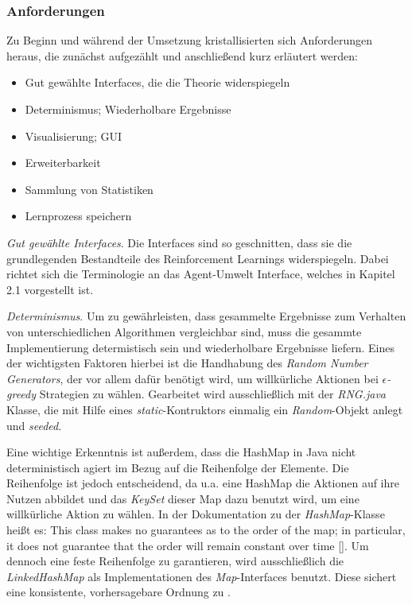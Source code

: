 

\subsubsection{Anforderungen}
Zu Beginn und während der Umsetzung kristallisierten sich Anforderungen heraus, die zunächst aufgezählt und anschließend kurz erläutert werden:

\begin{itemize}
    \item Gut gewählte Interfaces, die die Theorie widerspiegeln
    \item Determinismus; Wiederholbare Ergebnisse
    \item Visualisierung; GUI
    \item Erweiterbarkeit
    \item Sammlung von Statistiken
    \item Lernprozess speichern
\end{itemize}

\textit{Gut gewählte Interfaces}. Die Interfaces sind so geschnitten, dass sie die grundlegenden Bestandteile des Reinforcement Learnings widerspiegeln. Dabei richtet sich die Terminologie an das Agent-Umwelt Interface, welches in Kapitel 2.1 vorgestellt ist. 
\par 
\textit{Determinismus}. Um zu gewährleisten, dass gesammelte Ergebnisse zum Verhalten von unterschiedlichen Algorithmen vergleichbar sind, muss die gesammte Implementierung determistisch sein und wiederholbare Ergebnisse liefern. Eines der wichtigsten Faktoren hierbei ist die Handhabung des \textit{Random Number Generators}, der vor allem dafür benötigt wird, um \glqq willkürliche\grqq{} Aktionen bei $\epsilon$\textit{-greedy} Strategien zu wählen. Gearbeitet wird ausschließlich mit der \textit{RNG.java} Klasse, die mit Hilfe eines \textit{static}-Kontruktors einmalig ein \textit{Random}-Objekt anlegt und \textit{seeded}.
\par 
Eine wichtige Erkenntnis ist außerdem, dass die HashMap in Java nicht deterministisch agiert im Bezug auf die Reihenfolge der Elemente. Die Reihenfolge ist jedoch entscheidend, da u.a. eine HashMap die Aktionen auf ihre Nutzen abbildet und das \textit{KeySet} dieser Map dazu benutzt wird, um eine willkürliche Aktion zu wählen. In der Dokumentation zu der \textit{HashMap}-Klasse heißt es: \glqq This class makes no guarantees as to the order of the map; in particular, it does not guarantee that the order will remain constant over time \grqq{} []\cite{hashmap}.
Um dennoch eine feste Reihenfolge zu garantieren, wird ausschließlich die \textit{LinkedHashMap} als Implementationen des \textit{Map}-Interfaces benutzt. Diese sichert eine konsistente, vorhersagebare Ordnung zu \cite[]{linkedHashMap}.


